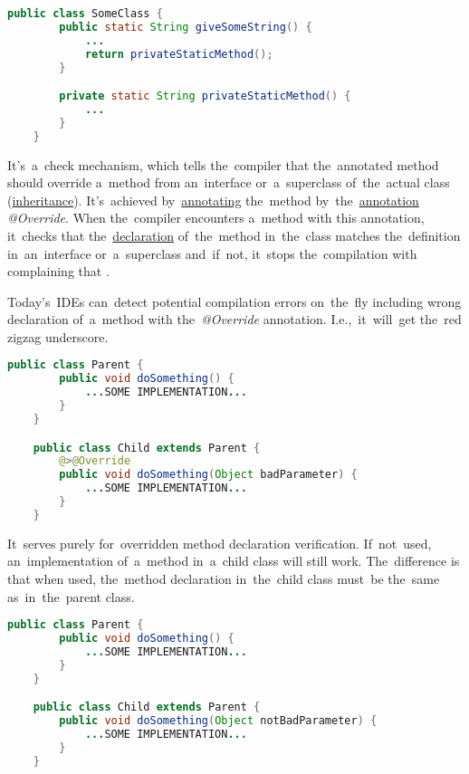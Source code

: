 \begin{lstlisting}[language=Java]
    public class SomeClass {
        public static String giveSomeString() {
            ...
            return privateStaticMethod();
        }

        private static String privateStaticMethod() {
            ...
        }
    }
\end{lstlisting}


\label{javaoverride}
It's~a~check mechanism, which tells the~compiler that the~annotated method should override a~method from an~interface or~a~superclass of~the~actual class (\hyperref[inheritance]{inheritance}).
It's~achieved by~\hyperref[javaannotation]{annotating} the~method by~the~\hyperref[javaannotation]{annotation} \textit{@Override}.
When the~compiler encounters a~method with this annotation, it~checks that the~\hyperref[declarationdefinition]{declaration} of~the~method in~the~class matches the~definition in~an~interface or~a~superclass and~if~not, it~stops the~compilation with complaining that .

\note Today's~IDEs can~detect potential compilation errors on~the~fly including wrong declaration of~a~method with the~\textit{@Override} annotation.
I.e.,~it~will~get the~red zigzag underscore.

\begin{lstlisting}[language=Java]
    public class Parent {
        public void doSomething() {
            ...SOME IMPLEMENTATION...
        }
    }

    public class Child extends Parent {
        @>@Override
        public void doSomething(Object badParameter) {
            ...SOME IMPLEMENTATION...
        }
    }
\end{lstlisting}

\warning It~serves purely for~overridden method declaration verification.
If~not~used, an~implementation of~a~method in~a~child class will still work.
The~difference is that when used, the~method declaration in~the~child class must~be the~same as~in~the~parent class.

\begin{lstlisting}[language=Java]
    public class Parent {
        public void doSomething() {
            ...SOME IMPLEMENTATION...
        }
    }

    public class Child extends Parent {
        public void doSomething(Object notBadParameter) {
            ...SOME IMPLEMENTATION...
        }
    }
\end{lstlisting}

